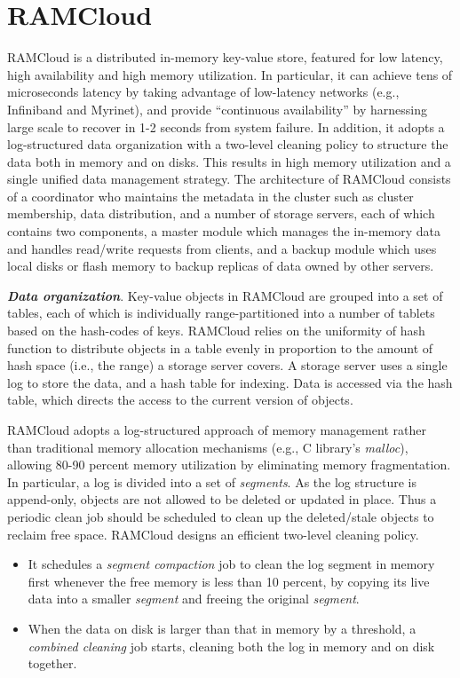 \documentclass[twocolumn]{article}
\begin{document}
\section{RAMCloud}
RAMCloud is a distributed in-memory key-value
store, featured for low latency, high availability and high memory
utilization. In particular, it can achieve tens of microseconds latency
by taking advantage of low-latency networks (e.g., Infiniband and
Myrinet), and provide ``continuous availability'' by harnessing large
scale to recover in 1-2 seconds from system failure. In addition, it
adopts a log-structured data organization with a two-level cleaning
policy to structure the data both in memory and on disks. This results
in high memory utilization and a single unified data management
strategy. The architecture of RAMCloud consists of a coordinator who
maintains the metadata in the cluster such as cluster membership, data
distribution, and a number of storage servers, each of which contains
two components, a master module which manages the in-memory data and
handles read/write requests from clients, and a backup module which uses
local disks or flash memory to backup replicas of data owned by other
servers.

\noindent
\textbf{\emph{Data organization}}. Key-value objects in RAMCloud are grouped into
a set of tables, each of which is individually range-partitioned into a
number of tablets based on the hash-codes of keys. RAMCloud relies on
the uniformity of hash function to distribute objects in a table evenly
in proportion to the amount of hash space (i.e., the range) a storage
server covers. A storage server uses a single log to store the data, and
a hash table for indexing. Data is accessed via the hash table, which
directs the access to the current version of objects.

RAMCloud adopts a log-structured approach of memory management rather
than traditional memory allocation mechanisms (e.g., C library's
\emph{malloc}), allowing 80-90 percent memory utilization by eliminating
memory fragmentation. In particular, a log is divided into a set of
\emph{segments}. As the log structure is append-only, objects are not
allowed to be deleted or updated in place. Thus a periodic clean job
should be scheduled to clean up the deleted/stale objects to reclaim
free space. RAMCloud designs an efficient two-level cleaning policy.

\begin{itemize}
\item
  It schedules a \emph{segment compaction} job to clean the log segment
  in memory first whenever the free memory is less than 10 percent, by
  copying its live data into a smaller \emph{segment} and freeing the
  original \emph{segment}.
\item
  When the data on disk is larger than that in memory by a threshold, a
  \emph{combined cleaning} job starts, cleaning both the log in memory
  and on disk together.
\end{itemize}
\end{document}
